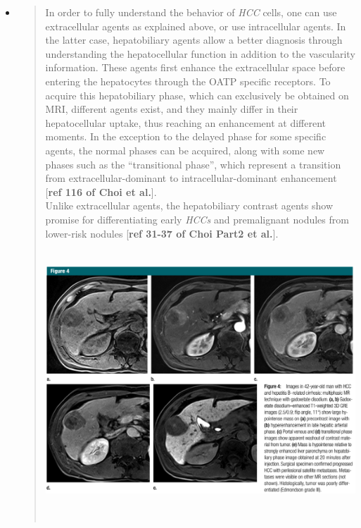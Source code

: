 \documentclass[]{article}
\begin{document}
\begin{itemize}
\item
  \begin{quote}
  In order to fully understand the behavior of \emph{HCC} cells, one can
  use extracellular agents as explained above, or use intracellular
  agents. In the latter case, hepatobiliary agents allow a better
  diagnosis through understanding the hepatocellular function in
  addition to the vascularity information. These agents first enhance
  the extracellular space before entering the hepatocytes through the
  OATP specific receptors. To acquire this hepatobiliary phase, which
  can exclusively be obtained on MRI, different agents exist, and they
  mainly differ in their hepatocellular uptake, thus reaching an
  enhancement at different moments. In the exception to the delayed
  phase for some specific agents, the normal phases can be acquired,
  along with some new phases such as the ``transitional phase'', which
  represent a transition from extracellular-dominant to
  intracellular-dominant enhancement {[}\textbf{ref 116 of Choi et
  al.}{]}.\\
  Unlike extracellular agents, the hepatobiliary contrast agents show
  promise for differentiating early \emph{HCCs} and premalignant nodules
  from lower-risk nodules {[}\textbf{ref 31-37 of Choi Part2 et
  al.}{]}.\\
  \includegraphics[width=5.62080in,height=4.11678in]{./images/media/image9.png}
  \end{quote}
\end{itemize}
\end{document}
